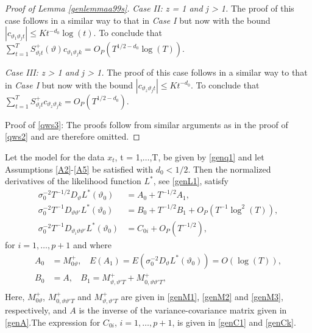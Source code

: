 {{\begin{proof}[Proof of Lemma \ref{genlemmaa99s}]
\textit{Case II: z = 1 and j > 1.} The proof of this case follows in a similar way to that in \textit{Case I} but now with the bound $|c_{\vartheta_1 \vartheta_j t}| \leq K t^{-d_0} \log(t)$. To conclude that $\sum_{t = 1}^{T} S_{\vartheta_l t}^+(\vartheta)  c_{\vartheta_1 \vartheta_j k} = O_P(T^{1/2-d_0} \log(T)) $.

\textit{Case III: z > 1 and j > 1.} The proof of this case follows in a similar way to that in \textit{Case I} but now with the bound $|c_{\vartheta_z \vartheta_j t}| \leq K t^{-d_0}$. To conclude that $\sum_{t = 1}^{T} S_{\vartheta_l t}^+  c_{\vartheta_z \vartheta_j k} = O_P(T^{1/2-d_0}) $.

Proof of \eqref{qws3}: The proofs follow from similar arguments as in the proof of \eqref{qws2} and are therefore omitted.


\end{proof}



\begin{lemma} \label{asyappgenstat1}
Let the model for the data $x_t$, t = 1,$\ldots$,T, be given by \eqref{genq1} and let Assumptions \ref{A2}-\ref{A5} be satisfied with $d_0 < 1/2$. Then the normalized derivatives of the likelihood function $L^*$, see \eqref{genL1}, satisfy
\begin{align}
    \sigma_0^{-2} T^{-1/2} D_{\vartheta} L^*(\vartheta_0)  &= A_{0} + T^{-1/2} A_{1}, \label{23a}\\
    \sigma_0^{-2} T^{-1} D_{\vartheta \vartheta'} L^*(\vartheta_0)  &= B_{0} + T^{-1/2}  B_{1} + O_P(T^{-1} \log^2(T) ), \label{23b}\\
     \sigma_0^{-2} T^{-1} D_{\vartheta_i \vartheta \vartheta'} L^*(\vartheta_0)  &= C_{0i} + O_P(T^{-1/2}), \label{23c} 
\end{align}
for $i = 1,\ldots,p+1$ and where
\begin{align*}
A_{0} &= M_{0\vartheta}^{+}, \ \ \ \ E(A_{1}) = E(\sigma^{-2}_0 D_{\vartheta} L^*(\vartheta_0) ) = O(\log(T)), \\
B_{0} &= A, \ \ \ \ B_1 = M_{\vartheta,\vartheta' T}^{+} + M_{0,\vartheta \vartheta' T}^{+}, \\
\end{align*}
Here,
$M_{0\vartheta}^{+}$, $M_{0,\vartheta \vartheta' T}^{+}$ and $M_{\vartheta,\vartheta' T}^{+}$ are given in \eqref{genM1}, \eqref{genM2} and \eqref{genM3}, respectively,
and $A$ is the inverse of the variance-covariance matrix given in \eqref{genA}.The expression for $C_{0i}$, $i = 1,\ldots,p+1$, is given in \eqref{genC1} and \eqref{genCk}. 
\end{lemma}



}}
